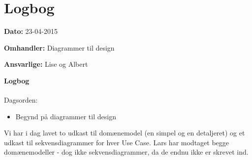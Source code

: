 \chapter{Logbog}

\textbf{Dato:} 23-04-2015

\textbf{Omhandler:} Diagrammer til design

\textbf{Ansvarlige:} Lise og Albert 

\textbf{Logbog}
\\
\\
Dagsorden:
\begin{itemize}
	\item Begynd på diagrammer til design
\end{itemize}

Vi har i dag lavet to udkast til domænemodel (en simpel og en detaljeret) og et udkast til sekvensdiagrammer for hver Use Case. Lars har modtaget begge domænemodeller - dog ikke sekvensdiagrammer, da de endnu ikke er skrevet ind.